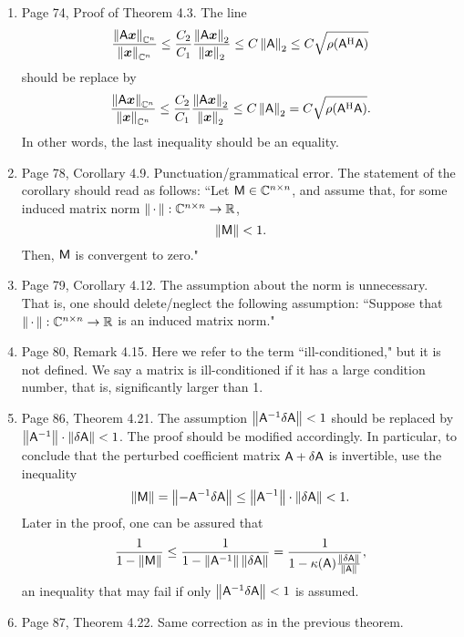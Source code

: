 \documentclass{book}
\begin{document}
	\begin{enumerate}
	
	\item
Page 74, Proof of Theorem 4.3. The line 
\[
  \frac{\left\| \mathsf{A} \boldsymbol{x} \right\|_{\mathbb C^n}}{\left\| \boldsymbol{x} \right\|_{\mathbb C^n}} \leq \frac{C_2}{C_1} \frac{\left\| \mathsf{A} \boldsymbol{x} \right\|_2}{\left\| \boldsymbol{x} \right\|_2} \leq C \left\| \mathsf{A} \right\|_2 \leq C \sqrt{\rho(\mathsf{A}^{\textup{H}}\mathsf{A})}
\]
should be replace by
\[
  \frac{\left\| \mathsf{A} \boldsymbol{x} \right\|_{\mathbb C^n}}{\left\| \boldsymbol{x} \right\|_{\mathbb C^n}} \leq \frac{C_2}{C_1} \frac{\left\| \mathsf{A} \boldsymbol{x} \right\|_2}{\left\| \boldsymbol{x} \right\|_2} \leq C \left\| \mathsf{A} \right\|_2 = C \sqrt{\rho(\mathsf{A}^{\textup{H}}\mathsf{A})}.
\]
In other words, the last inequality should be an equality.

	\item
Page 78, Corollary 4.9. Punctuation/grammatical error. The statement of the corollary should read as follows: ``Let $\mathsf{M}\in\mathbb C^{n\times n}$, and assume that, for some induced matrix norm $\left\| \, \cdot \, \right\| :\mathbb C^{n\times n} \to \mathbb R$,
\[
  \left\| \mathsf{M} \right\| < 1.
\]
Then, $\mathsf{M}$ is convergent to zero." 

	\item
Page 79, Corollary 4.12. The assumption about the norm is unnecessary. That is, one should delete/neglect the following assumption: ``Suppose that $\left\| \, \cdot \,  \right\|:\mathbb C^{n\times n}\to \mathbb R$ is an induced matrix norm."
	
	\item
Page 80, Remark 4.15. Here we refer to the term ``ill-conditioned," but it is not defined. We say a matrix is  ill-conditioned if it has a large condition number, that is, significantly larger than 1.

	\item
Page 86, Theorem 4.21. The assumption $\left\| \mathsf{A}^{-1}\delta\mathsf{A} \right\| < 1$ should be replaced by $\left\| \mathsf{A}^{-1} \right\| \cdot \left\| \delta\mathsf{A} \right\| < 1$. The proof should be modified accordingly. In particular, to conclude that the perturbed coefficient matrix $\mathsf{A}+\delta\mathsf{A}$ is invertible, use the inequality
	\[
\left\| \mathsf{M} \right\| = \left\|  - \mathsf{A}^{-1}\delta\mathsf{A} \right\| \le \left\| \mathsf{A}^{-1} \right\| \cdot \left\| \delta\mathsf{A} \right\| < 1.
	\]
Later in the proof, one can be assured that
	\[
\frac{1}{1-\left\| \mathsf{M} \right\|} \le \frac{1}{1-\left\| \mathsf{A}^{-1} \right\|\left\| \delta\mathsf{A} \right\|} = \frac{1}{1-\kappa(\mathsf{A}) \frac{\left\| \delta\mathsf{A} \right\|}{\left\| \mathsf{A} \right\|}},
	\]
an inequality that may fail if only $\left\| \mathsf{A}^{-1}\delta\mathsf{A} \right\| < 1$ is assumed.

	\item
Page 87, Theorem 4.22. Same correction as in the previous theorem.

	\end{enumerate}
	
\end{document}
